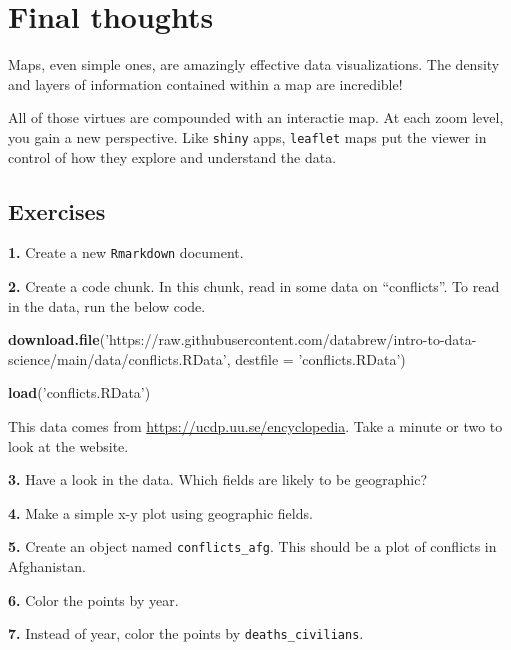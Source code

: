 \documentclass[]{book}
\newenvironment{Shaded}{\begin{snugshade}}{\end{snugshade}}
\newcommand{\DataTypeTok}[1]{\textcolor[rgb]{0.13,0.29,0.53}{#1}}
\newcommand{\KeywordTok}[1]{\textcolor[rgb]{0.13,0.29,0.53}{\textbf{#1}}}
\newcommand{\NormalTok}[1]{#1}
\newcommand{\StringTok}[1]{\textcolor[rgb]{0.31,0.60,0.02}{#1}}
\begin{document}
\hypertarget{final-thoughts-2}{%
\section*{Final thoughts}\label{final-thoughts-2}}

Maps, even simple ones, are amazingly effective data visualizations. The density and layers of information contained within a map are incredible!

All of those virtues are compounded with an interactie map. At each zoom level, you gain a new perspective. Like \texttt{shiny} apps, \texttt{leaflet} maps put the viewer in control of how they explore and understand the data.

\hypertarget{exercises-15}{%
\subsection*{Exercises}\label{exercises-15}}

\textbf{1.} Create a new \texttt{Rmarkdown} document.

\textbf{2.} Create a code chunk. In this chunk, read in some data on ``conflicts''. To read in the data, run the below code.

\begin{Shaded}
\begin{Highlighting}[]
\KeywordTok{download.file}\NormalTok{(}\StringTok{'https://raw.githubusercontent.com/databrew/intro-to-data-science/main/data/conflicts.RData'}\NormalTok{,}
              \DataTypeTok{destfile =} \StringTok{'conflicts.RData'}\NormalTok{)}

\KeywordTok{load}\NormalTok{(}\StringTok{'conflicts.RData'}\NormalTok{)}
\end{Highlighting}
\end{Shaded}

This data comes from \url{https://ucdp.uu.se/encyclopedia}. Take a minute or two to look at the website.

\textbf{3.} Have a look in the data. Which fields are likely to be geographic?

\textbf{4.} Make a simple x-y plot using geographic fields.

\textbf{5.} Create an object named \texttt{conflicts\_afg}. This should be a plot of conflicts in Afghanistan.

\textbf{6.} Color the points by year.

\textbf{7.} Instead of year, color the points by \texttt{deaths\_civilians}.
\end{document}
